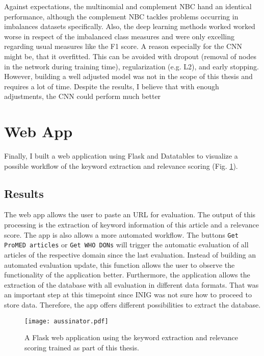   Against expectations, the multinomial and complement NBC hand an identical performance, although the complement NBC tackles problems occurring in imbalances datasets specifically.
  Also, the deep learning methods worked worked worse in respect of the imbalanced class measures and were only excelling regarding usual measures like the F1 score.
  A reason especially for the CNN might be, that it overfitted.
  This can be avoided with dropout (removal of nodes in the network during training time), regularization (e.g. L2), and early stopping.
  However, building a well adjusted model was not in the scope of this thesis and requires a lot of time.
  Despite the results, I believe that with enough adjustments, the CNN could perform much better

\section{Web App}
  Finally, I built a web application using Flask and Datatables to visualize a possible workflow of the keyword extraction and relevance scoring (Fig. \ref{fig:t-aussinator}).

\subsection{Results}
  The web app allows the user to paste an URL for evaluation.
  The output of this processing is the extraction of keyword information of this article and a relevance score.
  The app is also allows a more automated workflow. The buttons \texttt{Get ProMED articles} or \texttt{Get WHO DONs} will trigger the automatic evaluation of all articles of the respective domain since the last evaluation.
  Instead of building an automated evaluation update, this function allows the user to observe the functionality of the application better.
  Furthermore, the application allows the extraction of the database with all evaluation in different data formats.
  That was an important step at this timepoint since INIG was not sure how to proceed to store data.
  Therefore, the app offers different possibilities to extract the database.

  \begin{figure}
    \centering
    \texttt{[image: aussinator.pdf]}
    \caption{A Flask web application using the keyword extraction and relevance scoring trained as part of this thesis.}
  \label{fig:t-aussinator}
  \end{figure}

